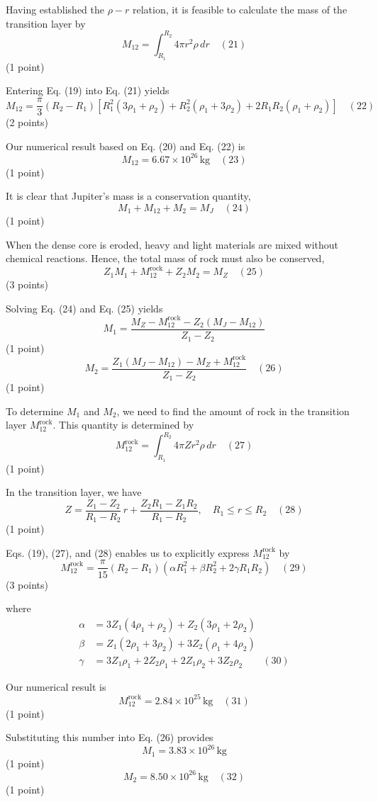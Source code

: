 \begin{description}
  Having established the $\rho - r$ relation, it is feasible to calculate the
  mass of the transition layer by
  \[ M_{12} = \int_{R_1}^{R_2} 4\pi r^2 \rho\,dr \quad (21) \]
  \hfill(1 point)

  Entering Eq. (19) into Eq. (21) yields
  \[ M_{12} = \frac{\pi}{3}(R_2 - R_1)\left[R_1^2(3\rho_1 + \rho_2)
     + R_2^2(\rho_1 + 3\rho_2) + 2R_1 R_2(\rho_1 + \rho_2)\right]
     \quad (22) \]
  \hfill(2 points)

  Our numerical result based on Eq. (20) and Eq. (22) is
  \[ M_{12} = 6.67 \times 10^{26}\,\mathrm{kg} \quad (23) \]
  \hfill(1 point)

\item[(c)] It is clear that Jupiter's mass is a conservation quantity,
  \[ M_1 + M_{12} + M_2 = M_J \quad (24) \]
  \hfill(1 point)

  When the dense core is eroded, heavy and light materials are mixed without
  chemical reactions. Hence, the total mass of rock must also be conserved,
  \[ Z_1 M_1 + M_{12}^{\mathrm{rock}} + Z_2 M_2 = M_Z \quad (25) \]
  \hfill(3 points)

  Solving Eq. (24) and Eq. (25) yields
  \[ M_1 = \frac{M_Z - M_{12}^{\mathrm{rock}} - Z_2(M_J - M_{12})}{Z_1 - Z_2} \]
  \hfill(1 point)
  \[ M_2 = \frac{Z_1(M_J - M_{12}) - M_Z + M_{12}^{\mathrm{rock}}}{Z_1 - Z_2}
     \quad (26) \]
  \hfill(1 point)

  To determine $M_1$ and $M_2$, we need to find the amount of rock in the
  transition layer $M_{12}^{\mathrm{rock}}$. This quantity is determined by
  \[ M_{12}^{\mathrm{rock}} = \int_{R_1}^{R_2} 4\pi Z r^2 \rho\,dr \quad (27) \]
  \hfill(1 point)

  In the transition layer, we have
  \[ Z = \frac{Z_1 - Z_2}{R_1 - R_2}\,r + \frac{Z_2 R_1 - Z_1 R_2}{R_1 - R_2},
     \quad R_1 \le r \le R_2 \quad (28) \]
  \hfill(1 point)

  Eqs. (19), (27), and (28) enables us to explicitly express
  $M_{12}^{\mathrm{rock}}$ by
  \[ M_{12}^{\mathrm{rock}} = \frac{\pi}{15}(R_2 - R_1)
     \left(\alpha R_1^2 + \beta R_2^2 + 2\gamma R_1 R_2\right) \quad (29) \]
  \hfill(3 points)

  where
  \begin{align*}
    \alpha &= 3Z_1(4\rho_1 + \rho_2) + Z_2(3\rho_1 + 2\rho_2) \\
    \beta  &= Z_1(2\rho_1 + 3\rho_2) + 3Z_2(\rho_1 + 4\rho_2) \\
    \gamma &= 3Z_1\rho_1 + 2Z_2\rho_1 + 2Z_1\rho_2 + 3Z_2\rho_2
    \qquad (30)
  \end{align*}

  Our numerical result is
  \[ M_{12}^{\mathrm{rock}} = 2.84 \times 10^{25}\,\mathrm{kg} \quad (31) \]
  \hfill(1 point)

  Substituting this number into Eq. (26) provides
  \[ M_1 = 3.83 \times 10^{26}\,\mathrm{kg} \]
  \hfill(1 point)
  \[ M_2 = 8.50 \times 10^{26}\,\mathrm{kg} \quad (32) \]
  \hfill(1 point)
\end{description}

